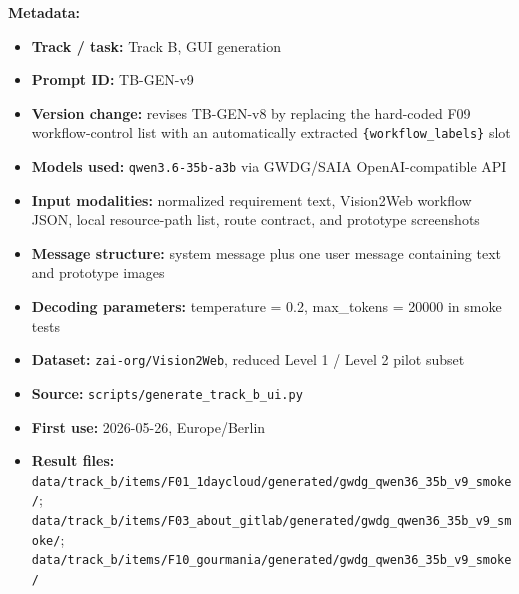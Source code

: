 \textbf{Metadata:}
\begin{itemize}
  \item \textbf{Track / task:} Track B, GUI generation
  \item \textbf{Prompt ID:} TB-GEN-v9
  \item \textbf{Version change:} revises TB-GEN-v8 by replacing the
  hard-coded F09 workflow-control list with an automatically extracted
  \texttt{\{workflow\_labels\}} slot
  \item \textbf{Models used:} \texttt{qwen3.6-35b-a3b} via GWDG/SAIA
  OpenAI-compatible API
  \item \textbf{Input modalities:} normalized requirement text, Vision2Web
  workflow JSON, local resource-path list, route contract, and prototype
  screenshots
  \item \textbf{Message structure:} system message plus one user message
  containing text and prototype images
  \item \textbf{Decoding parameters:} temperature = 0.2, max\_tokens = 20000
  in smoke tests
  \item \textbf{Dataset:} \texttt{zai-org/Vision2Web}, reduced Level 1 /
  Level 2 pilot subset
  \item \textbf{Source:} \texttt{scripts/generate\_track\_b\_ui.py}
  \item \textbf{First use:} 2026-05-26, Europe/Berlin
  \item \textbf{Result files:} \texttt{data/track\_b/items/F01\_1daycloud/generated/gwdg\_qwen36\_35b\_v9\_smoke/};
  \texttt{data/track\_b/items/F03\_about\_gitlab/generated/gwdg\_qwen36\_35b\_v9\_smoke/};
  \texttt{data/track\_b/items/F10\_gourmania/generated/gwdg\_qwen36\_35b\_v9\_smoke/}
\end{itemize}

